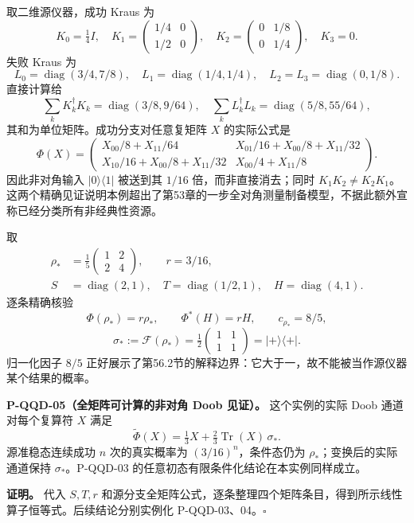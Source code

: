 \documentclass[
  11pt,
  oneside]{book}
\begin{document}
取二维源仪器，成功 Kraus 为 \[
K_0=\tfrac14I,\quad
K_1=\begin{pmatrix}1/4&0\\1/2&0\end{pmatrix},\quad
K_2=\begin{pmatrix}0&1/8\\0&1/4\end{pmatrix},\quad K_3=0.
\] 失败 Kraus 为 \[
L_0=\operatorname{diag}(3/4,7/8),\quad
L_1=\operatorname{diag}(1/4,1/4),\quad
L_2=L_3=\operatorname{diag}(0,1/8).
\] 直接计算给 \[
\sum_kK_k^\dagger K_k=\operatorname{diag}(3/8,9/64),
\quad \sum_kL_k^\dagger L_k=\operatorname{diag}(5/8,55/64),
\] 其和为单位矩阵。成功分支对任意复矩阵 \(X\) 的实际公式是 \[
\Phi(X)=\begin{pmatrix}
X_{00}/8+X_{11}/64&X_{01}/16+X_{00}/8+X_{11}/32\\
X_{10}/16+X_{00}/8+X_{11}/32&X_{00}/4+X_{11}/8
\end{pmatrix}.
\] 因此非对角输入 \(|0\rangle\langle1|\) 被送到其 \(1/16\)
倍，而非直接消去；同时
\(K_1K_2\ne K_2K_1\)。这两个精确见证说明本例超出了第53章的一步全对角测量制备模型，不据此额外宣称已经分类所有非经典性资源。

取 \[
\begin{aligned}
\rho_* &=\tfrac15\begin{pmatrix}1&2\\2&4\end{pmatrix},\qquad r=3/16,\\
S&=\operatorname{diag}(2,1),\quad T=\operatorname{diag}(1/2,1),\quad H=\operatorname{diag}(4,1).
\end{aligned}
\] 逐条精确核验 \[
\Phi(\rho_*)=r\rho_*,\qquad \Phi^*(H)=rH,\qquad
c_{\rho_*}=8/5,
\] \[
\sigma_*:=\mathcal F(\rho_*)=\tfrac12\begin{pmatrix}1&1\\1&1\end{pmatrix}
=|+\rangle\langle+|.
\] 归一化因子 \(8/5\)
正好展示了第56.2节的解释边界：它大于一，故不能被当作源仪器某个结果的概率。

\protect\hypertarget{p-qqd-05}{}{}

\textbf{P-QQD-05（全矩阵可计算的非对角 Doob 见证）。} 这个实例的实际
Doob 通道对每个复算符 \(X\) 满足 \[
\widetilde\Phi(X)=\tfrac13X+\tfrac23\operatorname{Tr}(X)\,\sigma_*.
\] 源准稳态连续成功 \(n\) 次的真实概率为 \((3/16)^n\)，条件态仍为
\(\rho_*\)；变换后的实际通道保持 \(\sigma_*\)。P-QQD-03
的任意初态有限条件化结论在本实例同样成立。

\textbf{证明。} 代入 \(S,T,r\)
和源分支全矩阵公式，逐条整理四个矩阵条目，得到所示线性算子恒等式。后续结论分别实例化
P-QQD-03、04。\(\square\)
\end{document}
